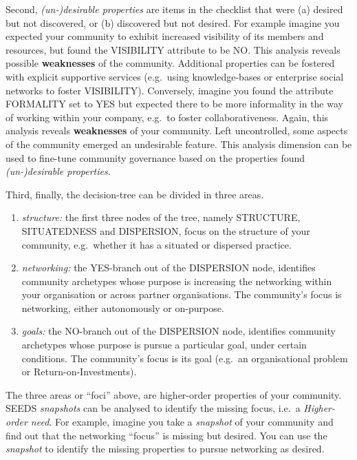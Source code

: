Second, \emph{\mbox{(un-)desirable} properties} are items in the checklist that were (a) desired but not discovered, or (b) discovered but not desired. For example imagine you expected your community to exhibit increased visibility of its members and resources, but found the VISIBILITY attribute to be NO. This analysis reveals possible \textbf{weaknesses} of the community. Additional properties can be fostered with explicit supportive services (e.g.~using knowledge-bases or enterprise social networks to foster VISIBILITY). Conversely, imagine you found the attribute FORMALITY set to YES but expected there to be more informality in the way of working within your company, e.g.~to foster collaborativeness. Again, this analysis reveals \textbf{weaknesses} of your community. Left uncontrolled, some aspects of the community emerged an undesirable feature. This analysis dimension can be used to fine-tune community governance based on the properties found \emph{\mbox{(un-)desirable} properties}.

Third, finally, the decision-tree can be divided in three areas. 
\begin{enumerate} 
\item \emph{structure:} the first three nodes of the tree, namely STRUCTURE, SITUATEDNESS and DISPERSION, focus on the structure of your community, e.g.~whether it has a situated or dispersed practice.
\item \emph{networking:} the YES-branch out of the DISPERSION node, identifies community archetypes whose purpose is increasing the networking within your organisation or across partner organisations. The community's focus is networking, either autonomously or on-purpose.
\item \emph{goals:} the NO-branch out of the DISPERSION node, identifies community archetypes whose purpose is pursue a particular goal, under certain conditions. The community's focus is its goal (e.g.~an organisational problem or Return-on-Investments).
\end{enumerate}

The three areas or ``foci'' above, are higher-order properties of your community. SEEDS \emph{\emph{snapshots}} can be analysed to identify the missing focus, i.e.~a \emph{Higher-order need}. For example, imagine you take a \emph{snapshot} of your community and find out that the networking ``focus'' is missing but desired. You can use the \emph{snapshot} to identify the missing properties to pursue networking as desired.

